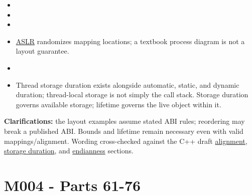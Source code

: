 \begin{itemize}
\tightlist
\item
\item
\item
\item
  \hyperref[appendix-78cb248c8355]{ASLR} randomizes mapping locations; a textbook process diagram is not a layout guarantee.
\item
\item
  Thread storage duration exists alongside automatic, static, and dynamic duration; thread-local storage is not simply the call stack. Storage duration governs available storage; lifetime governs the live object within it.
\end{itemize}

\textbf{Clarifications:} the layout examples assume stated ABI rules; reordering may break a published ABI. Bounds and lifetime remain necessary even with valid mappings/alignment. Wording cross-checked against the C++ draft \href{https://eel.is/c++draft/basic.align}{alignment}, \href{https://eel.is/c++draft/basic.stc}{storage duration}, and \href{https://eel.is/c++draft/bit.endian}{endianness} sections.

\section{M004 - Parts 61-76}\label{appendix-fd090d982a15-m004---parts-61-76}

